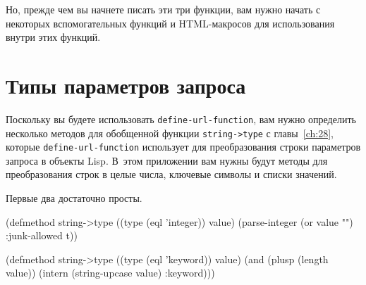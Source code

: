 Но, прежде чем вы начнете писать эти три функции, вам нужно начать с некоторых
вспомогательных функций и HTML-макросов для использования внутри этих функций.

\section{Типы параметров запроса}

Поскольку вы будете использовать \lstinline{define-url-function}, вам нужно определить
несколько методов для обобщенной функции \lstinline{string->type} с главы~\ref{ch:28},
которые \lstinline{define-url-function} использует для преобразования строки параметров
запроса в объекты Lisp. В~этом приложении вам нужны будут методы для преобразования строк
в целые числа, ключевые символы и списки значений.

Первые два достаточно просты.

\begin{myverb}
(defmethod string->type ((type (eql 'integer)) value)
  (parse-integer (or value "") :junk-allowed t))

(defmethod string->type ((type (eql 'keyword)) value)
  (and (plusp (length value)) (intern (string-upcase value) :keyword)))
\end{myverb}

